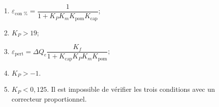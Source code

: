 \begin{corrigebox}
\begin{enumerate}
  \item $\varepsilon_{\text{con \%}} = \dfrac{1}{1+K_PK_m K_{\text{pom}} K_{\text{cap}} }$;
  \item $K_P > 19$;
  \item $\varepsilon_{\text{pert}} = \Delta Q_e \dfrac{K_f}{1+K_{\text{cap}}K_PK_mK_{\text{pom}}}$;
  \item $K_P > -1$.
  \item $K_P < 0,125$. Il est impossible de vérifier les trois conditions avec un correcteur proportionnel.
\end{enumerate}
\end{corrigebox}

